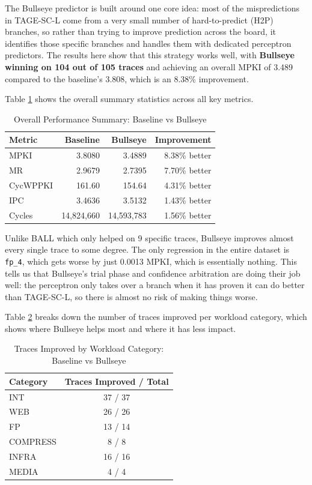 \documentclass[11pt,a4paper]{article}
\begin{document}
The Bullseye predictor is built around one core idea: most of the mispredictions 
in TAGE-SC-L come from a very small number of hard-to-predict (H2P) branches, 
so rather than trying to improve prediction across the board, it identifies those 
specific branches and handles them with dedicated perceptron predictors. The 
results here show that this strategy works well, with \textbf{Bullseye winning on 104
out of 105 traces} and achieving an overall MPKI of 3.489 compared to the 
baseline's 3.808, which is an 8.38\% improvement.

Table \ref{tab:bullseye_summary} shows the overall summary statistics across 
all key metrics.

\begin{table}[H]
\centering
\caption{Overall Performance Summary: Baseline vs Bullseye}
\label{tab:bullseye_summary}
\begin{tabular}{lrrr}
\toprule
\textbf{Metric} & \textbf{Baseline} & \textbf{Bullseye} & \textbf{Improvement} \\
\midrule
MPKI        & 3.8080 & 3.4889 & 8.38\% better \\
MR          & 2.9679 & 2.7395 & 7.70\% better \\
CycWPPKI    & 161.60 & 154.64 & 4.31\% better \\
IPC         & 3.4636 & 3.5132 & 1.43\% better \\
Cycles      & 14,824,660 & 14,593,783 & 1.56\% better \\
\bottomrule
\end{tabular}
\end{table}

Unlike BALL which only helped on 9 specific traces, Bullseye improves almost 
every single trace to some degree. The only regression in the entire dataset 
is \texttt{fp\_4}, which gets worse by just 0.0013 MPKI, which is essentially 
nothing. This tells us that Bullseye's trial phase and confidence arbitration 
are doing their job well: the perceptron only takes over a branch when it has 
proven it can do better than TAGE-SC-L, so there is almost no risk of making 
things worse.

Table \ref{tab:bullseye_category} breaks down the number of traces improved per workload 
category, which shows where Bullseye helps most and where it has less impact.

\begin{table}[H]
\centering
\caption{Traces Improved by Workload Category: Baseline vs Bullseye}
\label{tab:bullseye_category}
\begin{tabular}{lc}
\toprule
\textbf{Category} & \textbf{Traces Improved / Total} \\
\midrule
INT      & 37 / 37 \\
WEB      & 26 / 26 \\
FP       & 13 / 14 \\
COMPRESS & 8 / 8 \\
INFRA    & 16 / 16 \\
MEDIA    & 4 / 4 \\
\bottomrule
\end{tabular}
\end{table}
\end{document}
